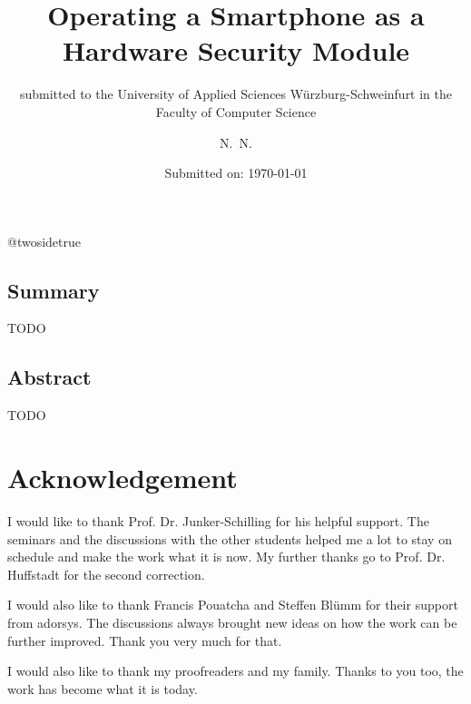 \documentclass[12pt,twoside,a4paper,parskip]{scrbook}
\makeatletter
\def\BaAuthor{Achim Winter}
\def\BaAuthorStudyProgram{Computer Science}
\def\BaType{Bachelor thesis} %
\def\BaTitle{Operating a Smartphone as a Hardware Security Module}
\def\BaSupervisorOne{Prof.\ Dr.\ Junker-Schilling}
\def\BaSupervisorTwo{Prof.\ Dr.\ Huffstadt}
\def\BaDeadline{\today}
\def\ShowBaAuthor{\BaAuthor}
\def\ShowBaAuthor{N.~N.}
\newcommand*{\forcetwosidetitle}[1][1]{%
 \begingroup
   \cleardoubleoddpage
   \KOMAoptions{titlepage=true}%
   \csname @twosidetrue\endcsname
   \maketitle[{#1}]
 \endgroup
}
\makeatother
\begin{document}


\frontmatter
\titlehead{%
  {University of applied Sciences W\"{u}rzburg-Schweinfurt\\
   Faculty of Computer Science und Business Informatics}}
\subject{\BaType}
\title{\BaTitle\\[15mm]}
\subtitle{\normalsize{submitted to the University of Applied Sciences W\"{u}rzburg-Schweinfurt in the Faculty of \BaAuthorStudyProgram}}
\author{\ShowBaAuthor}
\date{\normalsize{Submitted on: \BaDeadline}}
\publishers{
  \normalsize{First Supervisor: \BaSupervisorOne}\\
  \normalsize{Second Supervisor: \BaSupervisorTwo}\\
}

\forcetwosidetitle



\section*{Summary}
TODO

\section*{Abstract}

TODO

\newpage
\chapter*{Acknowledgement}

I would like to thank Prof. Dr. Junker-Schilling for his helpful support. The seminars and the discussions with the other students helped me a lot to stay on schedule and make the work what it is now. My further thanks go to Prof. Dr. Huffstadt for the second correction. 

I would also like to thank Francis Pouatcha and Steffen Blümm for their support from adorsys. The discussions always brought new ideas on how the work can be further improved. Thank you very much for that.

I would also like to thank my proofreaders and my family. Thanks to you too, the work has become what it is today.

\tableofcontents
\end{document}

